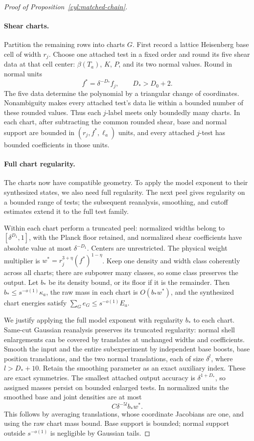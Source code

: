 \begin{proof}[Proof of Proposition~\ref{cyl:matched-chain}]
\paragraph{Shear charts.}
Partition the remaining rows into charts $G$.  First record a lattice
Heisenberg base cell of width $r_j$.  Choose one attached test in a fixed
order and round its five shear data at that cell center: $\beta(T_a)$,
$K$, $P$, and its two normal values.  Round in normal units
\[
 f^*=\delta^{-D_*}f_j,\qquad D_*>D_0+2.
\]
The five data determine the polynomial by a triangular change of
coordinates.  Nonambiguity makes every attached test's data lie within
a bounded number of these rounded values.  Thus each $j$-label meets
only boundedly many charts.  In each chart, after subtracting the common
rounded shear, base and normal support are bounded in
$(r_j,f^*,\ell_a)$ units, and every attached $j$-test has bounded
coefficients in those units.

\paragraph{Full chart regularity.}
The charts now have compatible geometry. To apply the model exponent to
their synthesized states, we also need full regularity. The next peel gives
regularity on a bounded range of tests; the subsequent reanalysis,
smoothing, and cutoff estimates extend it to the full test family.

Within each chart perform a truncated peel: normalized widths belong to
$[\delta^{D_1},1]$, with the Planck floor retained, and normalized shear
coefficients have absolute value at most $\delta^{-D_1}$.  Centers are
unrestricted.  The physical weight multiplier is
$w^*=r_j^{3+\eta}(f^*)^{1-\eta}$.  Keep one density and width class
coherently across all charts; there are subpower many classes, so some
class preserves the output.  Let $b_*$ be its density bound, or its
floor if it is the remainder.  Then $b_*\le s^{-o(1)}\kappa_a$,
the raw mass in each chart is $O(b_*w^*)$, and the synthesized chart
energies satisfy $\sum_G e_G\le s^{-o(1)}E_a$.

We justify applying the full model exponent with regularity $b_*$ to
each chart.  Same-cut Gaussian reanalysis preserves its truncated
regularity: normal shell enlargements can be covered by translates at
unchanged widths and coefficients.  Smooth the input and the entire
subexperiment by independent base boosts, base position translations,
and the two normal translations, each of size $\delta^l$, where
$l>D_*+10$.  Retain the smoothing parameter as an exact auxiliary index.
These are exact symmetries.  The smallest attached output accuracy is
$\delta^{1+D_*}$, so assigned masses persist on bounded enlarged tests.
In normalized units the smoothed base and joint densities are at most
\[
 C\delta^{-5l} b_* w^*.
\]
This follows by averaging translations, whose coordinate Jacobians are
one, and using the raw chart mass bound.  Base support is bounded;
normal support outside $s^{-o(1)}$ is negligible by Gaussian tails.


\end{proof}
